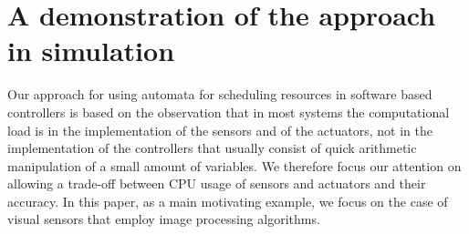 \documentclass{sig-alternate-ipsn13}
\begin{document}
%


\section{A demonstration of the approach in simulation}

Our approach for using automata for scheduling resources in software based controllers is based on the observation that in most systems the computational load is in the implementation of the sensors and of the actuators, not in the implementation of the controllers that usually consist of quick arithmetic manipulation of a small amount of variables. We therefore focus our attention on allowing a trade-off between CPU usage of sensors and actuators and their accuracy. In this paper, as a main motivating example, we focus on the case of visual sensors that employ image processing algorithms.
\end{document}
